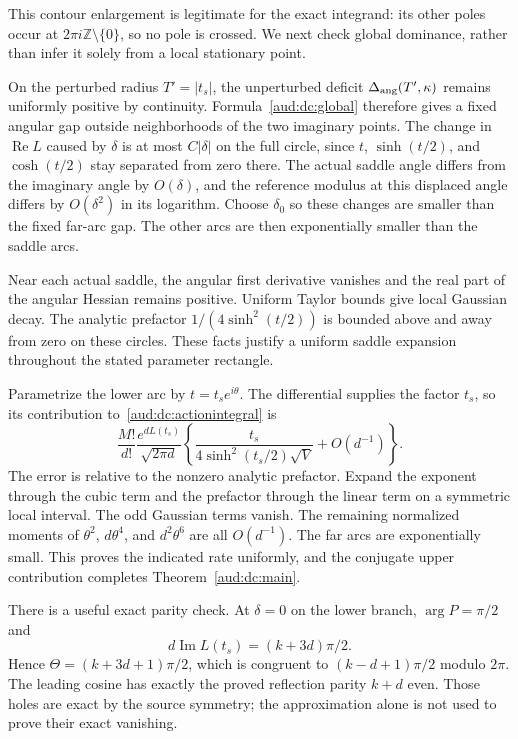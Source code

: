 \documentclass[11pt,a4paper]{article}
\numberwithin{equation}{section}
\begin{document}
This contour enlargement is legitimate for the exact integrand: its other poles occur at $2\pi i\mathbb Z\setminus\{0\}$, so no pole is crossed. We next check global dominance, rather than infer it solely from a local stationary point.

On the perturbed radius $T'=|t_s|$, the unperturbed deficit $\Delta_{\rm ang}(T',\kappa)$ remains uniformly positive by continuity. Formula~\eqref{aud:dc:global} therefore gives a fixed angular gap outside neighborhoods of the two imaginary points. The change in $\operatorname{Re}L$ caused by $\delta$ is at most $C|\delta|$ on the full circle, since $t$, $\sinh(t/2)$, and $\cosh(t/2)$ stay separated from zero there. The actual saddle angle differs from the imaginary angle by $O(\delta)$, and the reference modulus at this displaced angle differs by $O(\delta^2)$ in its logarithm. Choose $\delta_0$ so these changes are smaller than the fixed far-arc gap. The other arcs are then exponentially smaller than the saddle arcs.

Near each actual saddle, the angular first derivative vanishes and the real part of the angular Hessian remains positive. Uniform Taylor bounds give local Gaussian decay. The analytic prefactor $1/(4\sinh^2(t/2))$ is bounded above and away from zero on these circles. These facts justify a uniform saddle expansion throughout the stated parameter rectangle.

Parametrize the lower arc by $t=t_s e^{i\theta}$. The differential supplies the factor $t_s$, so its contribution to~\eqref{aud:dc:actionintegral} is
\[
 \frac{M!}{d!}\frac{e^{dL(t_s)}}{\sqrt{2\pi d}}
 \left\{\frac{t_s}{4\sinh^2(t_s/2)\sqrt V}+O(d^{-1})\right\}.
\]
The error is relative to the nonzero analytic prefactor. Expand the exponent through the cubic term and the prefactor through the linear term on a symmetric local interval. The odd Gaussian terms vanish. The remaining normalized moments of $\theta^2$, $d\theta^4$, and $d^2\theta^6$ are all $O(d^{-1})$. The far arcs are exponentially small. This proves the indicated rate uniformly, and the conjugate upper contribution completes Theorem~\ref{aud:dc:main}.

There is a useful exact parity check. At $\delta=0$ on the lower branch, $\arg P=\pi/2$ and
\[
 d\operatorname{Im}L(t_s)=(k+3d)\pi/2.
\]
Hence $\Theta=(k+3d+1)\pi/2$, which is congruent to $(k-d+1)\pi/2$ modulo $2\pi$. The leading cosine has exactly the proved reflection parity $k+d$ even. Those holes are exact by the source symmetry; the approximation alone is not used to prove their exact vanishing.
\end{document}
